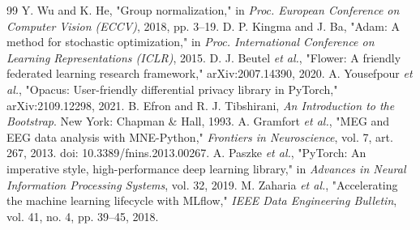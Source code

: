 \documentclass[12pt,a4paper,oneside]{report}
\begin{document}
\begin{thebibliography}{99}
 Y. Wu and K. He, "Group normalization," in \emph{Proc. European Conference on Computer Vision (ECCV)}, 2018, pp. 3--19.
 D. P. Kingma and J. Ba, "Adam: A method for stochastic optimization," in \emph{Proc. International Conference on Learning Representations (ICLR)}, 2015.
 D. J. Beutel \emph{et al.}, "Flower: A friendly federated learning research framework," arXiv:2007.14390, 2020.
 A. Yousefpour \emph{et al.}, "Opacus: User-friendly differential privacy library in PyTorch," arXiv:2109.12298, 2021.
 B. Efron and R. J. Tibshirani, \emph{An Introduction to the Bootstrap}. New York: Chapman \& Hall, 1993.
 A. Gramfort \emph{et al.}, "MEG and EEG data analysis with MNE-Python," \emph{Frontiers in Neuroscience}, vol. 7, art. 267, 2013. doi: 10.3389/fnins.2013.00267.
 A. Paszke \emph{et al.}, "PyTorch: An imperative style, high-performance deep learning library," in \emph{Advances in Neural Information Processing Systems}, vol. 32, 2019.
 M. Zaharia \emph{et al.}, "Accelerating the machine learning lifecycle with MLflow," \emph{IEEE Data Engineering Bulletin}, vol. 41, no. 4, pp. 39--45, 2018.
\end{thebibliography}
\end{document}
